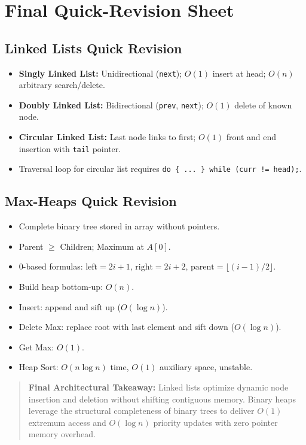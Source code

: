 \section{Final Quick-Revision Sheet}

\subsection{Linked Lists Quick Revision}
\begin{itemize}
    \item \textbf{Singly Linked List:} Unidirectional (\texttt{next}); $O(1)$ insert at head; $O(n)$ arbitrary search/delete.
    \item \textbf{Doubly Linked List:} Bidirectional (\texttt{prev}, \texttt{next}); $O(1)$ delete of known node.
    \item \textbf{Circular Linked List:} Last node links to first; $O(1)$ front and end insertion with \texttt{tail} pointer.
    \item Traversal loop for circular list requires \texttt{do \{ ... \} while (curr != head);}.
\end{itemize}

\subsection{Max-Heaps Quick Revision}
\begin{itemize}
    \item Complete binary tree stored in array without pointers.
    \item Parent $\geq$ Children; Maximum at $A[0]$.
    \item 0-based formulas: $\text{left} = 2i + 1$, $\text{right} = 2i + 2$, $\text{parent} = \lfloor(i-1)/2\rfloor$.
    \item Build heap bottom-up: $O(n)$.
    \item Insert: append and sift up ($O(\log n)$).
    \item Delete Max: replace root with last element and sift down ($O(\log n)$).
    \item Get Max: $O(1)$.
    \item Heap Sort: $O(n \log n)$ time, $O(1)$ auxiliary space, unstable.
\end{itemize}

\begin{quote}
\textbf{Final Architectural Takeaway:} Linked lists optimize dynamic node insertion and deletion without shifting contiguous memory. Binary heaps leverage the structural completeness of binary trees to deliver $O(1)$ extremum access and $O(\log n)$ priority updates with zero pointer memory overhead.
\end{quote}
